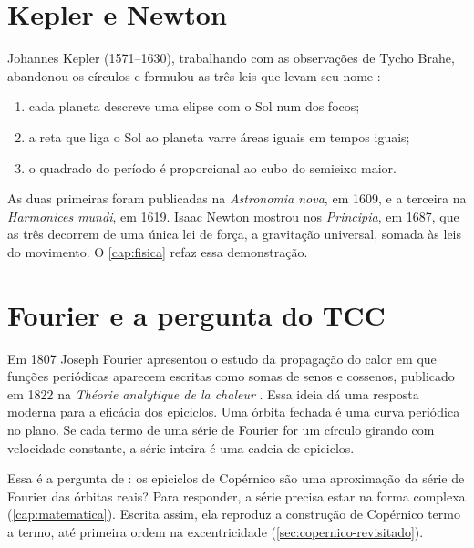\section{Kepler e Newton}

Johannes Kepler (1571--1630), trabalhando com as observações de Tycho Brahe, abandonou os círculos e formulou as três leis que levam seu nome \cite{kuhn2002}:

\begin{enumerate}
  \item cada planeta descreve uma elipse com o Sol num dos focos;
  \item a reta que liga o Sol ao planeta varre áreas iguais em tempos iguais;
  \item o quadrado do período é proporcional ao cubo do semieixo maior.
\end{enumerate}

As duas primeiras foram publicadas na \emph{Astronomia nova}, em 1609, e a terceira na \emph{Harmonices mundi}, em 1619. Isaac Newton mostrou nos \emph{Principia}, em 1687, que as três decorrem de uma única lei de força, a gravitação universal, somada às leis do movimento. O \autoref{cap:fisica} refaz essa demonstração.

\section{Fourier e a pergunta do TCC}

Em 1807 Joseph Fourier apresentou o estudo da propagação do calor em que funções periódicas aparecem escritas como somas de senos e cossenos, publicado em 1822 na \emph{Théorie analytique de la chaleur} \cite{pifer2015}. Essa ideia dá uma resposta moderna para a eficácia dos epiciclos. Uma órbita fechada é uma curva periódica no plano. Se cada termo de uma série de Fourier for um círculo girando com velocidade constante, a série inteira é uma cadeia de epiciclos.

Essa é a pergunta de : os epiciclos de Copérnico são uma aproximação da série de Fourier das órbitas reais? Para responder, a série precisa estar na forma complexa (\autoref{cap:matematica}). Escrita assim, ela reproduz a construção de Copérnico termo a termo, até primeira ordem na excentricidade (\autoref{sec:copernico-revisitado}).

